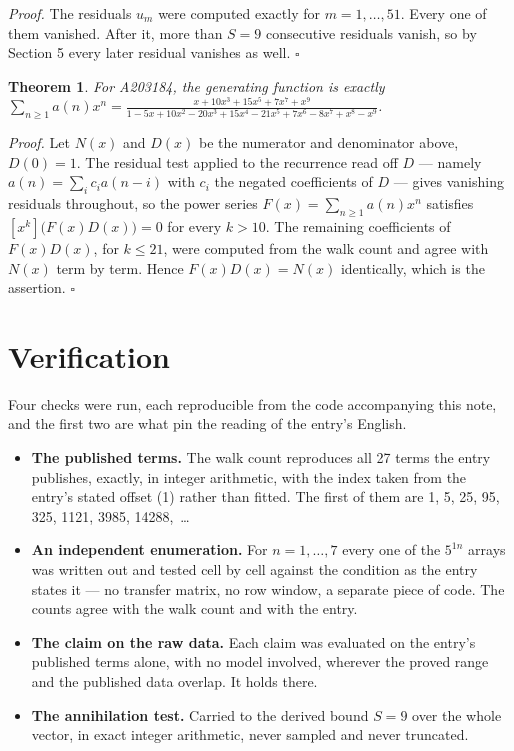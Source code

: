 \documentclass[11pt]{article}
\newtheorem{theorem}{Theorem}
\theoremstyle{definition}
\begin{document}
{\itshape Proof.} The residuals $u_m$ were computed exactly for $m = 1,\dots,51$. Every one of them vanished. After it, more than $S = 9$ consecutive residuals vanish, so by Section 5 every later residual vanishes as well. $\square$

\begin{theorem} For A203184, the generating function is exactly $\sum_{n\ge 1} a(n)x^n = \frac{x + 10x^{3} + 15x^{5} + 7x^{7} + x^{9}}{1 - 5x + 10x^{2} - 20x^{3} + 15x^{4} - 21x^{5} + 7x^{6} - 8x^{7} + x^{8} - x^{9}}$.\end{theorem}

{\itshape Proof.} Let $N(x)$ and $D(x)$ be the numerator and denominator above, $D(0)=1$. The residual test applied to the recurrence read off $D$ --- namely $a(n) = \sum_i c_i a(n-i)$ with $c_i$ the negated coefficients of $D$ --- gives vanishing residuals throughout, so the power series $F(x)=\sum_{n\ge 1}a(n)x^n$ satisfies $[x^k]\bigl(F(x)D(x)\bigr) = 0$ for every $k > 10$. The remaining coefficients of $F(x)D(x)$, for $k \le 21$, were computed from the walk count and agree with $N(x)$ term by term. Hence $F(x)D(x) = N(x)$ identically, which is the assertion. $\square$

\section{Verification}

Four checks were run, each reproducible from the code accompanying this note, and the first two are what pin the reading of the entry's English.

\begin{itemize}

\item {\bfseries The published terms.} The walk count reproduces all 27 terms the entry publishes, exactly, in integer arithmetic, with the index taken from the entry's stated offset (1) rather than fitted. The first of them are 1, 5, 25, 95, 325, 1121, 3985, 14288,~\dots

\item {\bfseries An independent enumeration.} For $n = 1,\dots,7$ every one of the $5^{1n}$ arrays was written out and tested cell by cell against the condition as the entry states it --- no transfer matrix, no row window, a separate piece of code. The counts agree with the walk count and with the entry.

\item {\bfseries The claim on the raw data.} Each claim was evaluated on the entry's published terms alone, with no model involved, wherever the proved range and the published data overlap. It holds there.

\item {\bfseries The annihilation test.} Carried to the derived bound $S = 9$ over the whole vector, in exact integer arithmetic, never sampled and never truncated.

\end{itemize}
\end{document}
